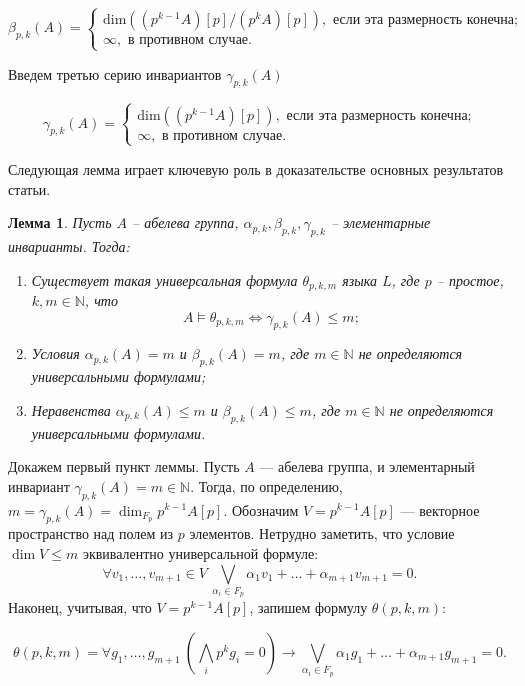 \documentclass[a4paper,11pt,twoside]{article}
\newtheorem{lemma}{Лемма}[section]
\def\proof{{\noindent{\bf Доказательство.}} }
\def\N{{\mathbb{N}}}
\begin{document}
$$\beta_{p,k}(A) = \left\lbrace 
\begin{array}{l}  
\mathrm{dim} \left( (p^{k-1}A) [p] \Big/ (p^k A) [p] \right), \text{ если эта размерность конечна;} \\ 
\infty, \text{ в противном случае.}
\end{array} 
\right.$$

Введем третью серию инвариантов $\gamma_{p,k}(A)$

$$\gamma_{p,k}(A) = \left\lbrace 
\begin{array}{l}  
\mathrm{dim} \left( (p^{k-1} A) [p] \right), \text{ если эта размерность конечна;} \\ 
\infty, \text{ в противном случае.}
\end{array} 
\right.$$

Следующая лемма играет ключевую роль в доказательстве основных результатов статьи.

\begin{lemma}\label{lemma:gamma}
Пусть $A$ -- абелева группа, $\alpha_{p,k}, \beta_{p,k}, \gamma_{p,k}$ -- элементарные инварианты. Тогда:
\begin{enumerate}
\item Существует такая универсальная формула $\theta_{p,k,m}$ языка $L$, где $p$ -- простое, $k,m \in \N$, что 
$$A \models \theta_{p,k,m} \Leftrightarrow \gamma_{p,k}(A) \leq m;$$
\item Условия $\alpha_{p,k}(A) = m$ и $\beta_{p,k}(A) = m$, где $m \in \N$ не определяются универсальными формулами;
\item Неравенства $\alpha_{p,k}(A) \leq m$ и $\beta_{p,k}(A) \leq m$, где $m \in \N$ не определяются универсальными формулами.
\end{enumerate}
\end{lemma}
\proof Докажем первый пункт леммы. Пусть $A$ --- абелева группа, и элементарный инвариант $\gamma_{p,k}(A) = m \in \N$. Тогда, по определению, $m = \gamma_{p,k} (A) = \dim_{F_p} p^{k-1} A[p]$. Обозначим $V = p^{k-1} A[p]$ --- векторное пространство над полем из $p$ элементов. Нетрудно заметить, что условие $\dim V \leq m$ эквивалентно универсальной формуле: 
$$\forall v_1, \ldots, v_{m+1} \in V \ \bigvee_{\alpha_i \in F_p} \alpha_1v_1 + \ldots + \alpha_{m+1}v_{m+1} = 0.$$
Наконец, учитывая, что $V = p^{k-1}A[p]$, запишем формулу $\theta(p,k,m)$:

$$
\theta(p,k,m) = \forall g_1, \ldots, g_{m+1} \ (\bigwedge_i p^{k}g_{i} = 0) \rightarrow  \bigvee_{\alpha_i \in F_p} \alpha_1g_1 + \ldots + \alpha_{m+1}g_{m+1} = 0.
$$
\end{document}
